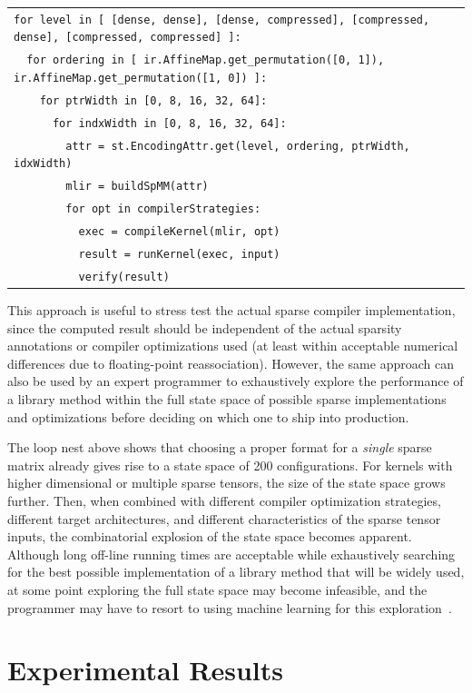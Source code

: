 \documentclass[10pt]{article}
\newcommand{\exam}{\begin{flushleft}\scriptsize\begin{tabular}{l}}
\newcommand{\maxe}{\end{tabular}\end{flushleft}}
\begin{document}
\exam
\verb"for level in [ [dense, dense], [dense, compressed], [compressed, dense], [compressed, compressed] ]:" \\
\verb"  for ordering in [ ir.AffineMap.get_permutation([0, 1]), ir.AffineMap.get_permutation([1, 0]) ]:" \\
\verb"    for ptrWidth in [0, 8, 16, 32, 64]:" \\
\verb"      for indxWidth in [0, 8, 16, 32, 64]:" \\
\verb"        attr = st.EncodingAttr.get(level, ordering, ptrWidth, idxWidth)" \\
\verb"        mlir = buildSpMM(attr)" \\
\verb"        for opt in compilerStrategies:" \\
\verb"          exec = compileKernel(mlir, opt)" \\
\verb"          result = runKernel(exec, input)" \\
\verb"          verify(result)" \\
\maxe

This approach is useful to stress test the actual sparse compiler implementation, since the computed result should be independent of the actual sparsity annotations or compiler optimizations used (at least within acceptable numerical differences due to floating-point reassociation). However, the same approach can also be used by an expert programmer to exhaustively explore the performance of a library method within the full state space of possible sparse implementations and optimizations before deciding on which one to ship into production.

The loop nest above shows that choosing a proper format for a \emph{single} sparse matrix already gives rise to a state space of 200 configurations. For kernels with higher dimensional or multiple sparse tensors, the size of the state space grows further. Then, when combined with different compiler optimization strategies, different target architectures, and different characteristics of the sparse tensor inputs, the combinatorial explosion of the state space becomes apparent. Although long off-line running times are acceptable while exhaustively searching for the best possible implementation of a library method that will be widely used, at some point exploring the full state space may become infeasible, and the programmer may have to resort to using machine learning for this exploration~\cite{gus}.

\section{Experimental Results}
\label{experiments}
\end{document}
